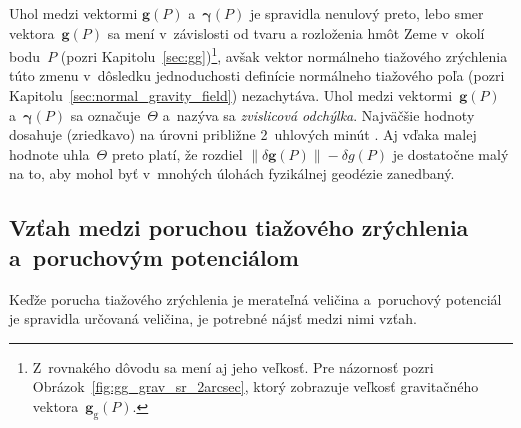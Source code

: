 \documentclass[a4paper, 12pt]{book}
\newcommand{\gidx}{\mathrm g}
\let\vec\mathbf
\begin{document}
Uhol medzi vektormi $\vec g(P)$ a~$\boldsymbol{\gamma}(P)$ je spravidla 
nenulový preto, lebo smer vektora~$\vec g(P)$ sa mení v~závislosti od tvaru 
a rozloženia hmôt Zeme v~okolí bodu~$P$ (pozri 
Kapitolu~\ref{sec:gg})\footnote{Z~rovnakého dôvodu sa mení aj jeho veľkosť.  
Pre názornosť pozri Obrázok~\ref{fig:gg_grav_sr_2arcsec}, ktorý zobrazuje 
veľkosť gravitačného vektora~$\vec g_\gidx(P)$.}, avšak vektor normálneho 
tiažového zrýchlenia túto zmenu v~dôsledku jednoduchosti definície normálneho 
tiažového poľa (pozri Kapitolu~\ref{sec:normal_gravity_field}) nezachytáva.  
Uhol medzi vektormi~$\vec g(P)$ a~$\boldsymbol \gamma(P)$ sa označuje~$\Theta$ 
a~nazýva sa \emph{zvislicová odchýlka}.  Najväčšie hodnoty dosahuje (zriedkavo) 
na úrovni približne 2~uhlových minút \parencite{GGMplus}.  Aj vďaka malej 
hodnote uhla~$\Theta$ preto platí, že rozdiel $\| \delta \vec g(P) \| - \delta 
g(P)$ je dostatočne malý na to, aby mohol byť v~mnohých úlohách fyzikálnej 
geodézie zanedbaný.


\subsection{Vzťah medzi poruchou tiažového zrýchlenia a~poruchovým potenciálom}

Keďže porucha tiažového zrýchlenia je merateľná veličina a~poruchový potenciál 
je spravidla určovaná veličina, je potrebné nájsť medzi nimi vzťah.
\end{document}
